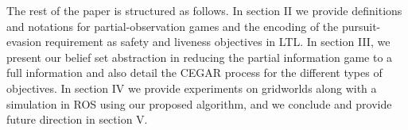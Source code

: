 The rest of the paper is structured as follows. In section II we provide definitions and notations for partial-observation games and the encoding of the pursuit-evasion requirement as safety and liveness objectives in LTL. In section III, we present our belief set abstraction in reducing the partial information game to a full information and also detail the CEGAR process for the different types of objectives. In section IV we provide experiments on gridworlds along with a simulation in ROS using our proposed algorithm, and we conclude and provide future direction in section V. 
